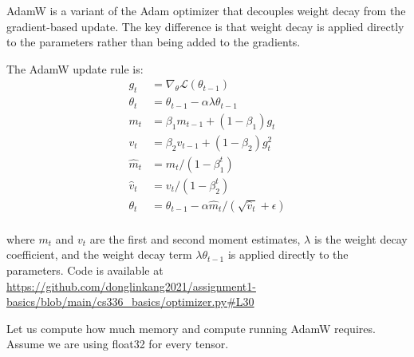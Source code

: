 \begin{answer}
AdamW is a variant of the Adam optimizer that decouples weight decay from the gradient-based update. The key difference is that weight decay is applied directly to the parameters rather than being added to the gradients.

The AdamW update rule is:
\begin{equation*}
\begin{aligned}
g_t &= \nabla_\theta \mathcal{L}(\theta_{t-1}) \\
\theta_t &= \theta_{t-1} - \alpha \lambda \theta_{t-1} \\
m_t &= \beta_1 m_{t-1} + (1 - \beta_1) g_t \\
v_t &= \beta_2 v_{t-1} + (1 - \beta_2) g_t^2 \\
\hat{m}_t &= m_t / (1 - \beta_1^t) \\
\hat{v}_t &= v_t / (1 - \beta_2^t) \\
\theta_t &= \theta_{t-1} - \alpha \hat{m}_t / (\sqrt{\hat{v}_t} + \epsilon) \\
\end{aligned}
\end{equation*}

where $m_t$ and $v_t$ are the first and second moment estimates, $\lambda$ is the weight decay coefficient, and the weight decay term $\lambda \theta_{t-1}$ is applied directly to the parameters. Code is available at \url{https://github.com/donglinkang2021/assignment1-basics/blob/main/cs336_basics/optimizer.py#L30}
\end{answer}


Let us compute how much memory and compute running AdamW requires. Assume we are using float32 for every tensor.

